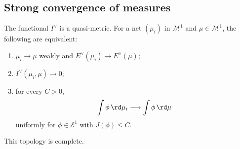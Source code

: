 \subsection{Strong convergence of measures}
\label{sec:ch48-strong-measures}

\begin{theorem}\label{thm:bj-strong-measures}
The functional $I^\vee$ is a quasi-metric.  For a net
$(\mu_i)$ in $\mathcal M^1$ and $\mu\in\mathcal M^1$, the following
are equivalent:

\begin{enumerate}
\item\label{itm:ch48-sm:weak} $\mu_i\to\mu$ weakly and
      $E^\vee(\mu_i)\to E^\vee(\mu)$;
\item\label{itm:ch48-sm:gauge} $I^\vee(\mu_i,\mu)\to0$;
\item\label{itm:ch48-sm:pairing} for every $C>0$,
\[
  \int\phi\,\rd \mu_i\longrightarrow\int\phi\,\rd \mu
\]
uniformly for $\phi\in\mathcal E^1$ with $J(\phi)\leq C$.
\end{enumerate}

This topology is complete.
\end{theorem}

